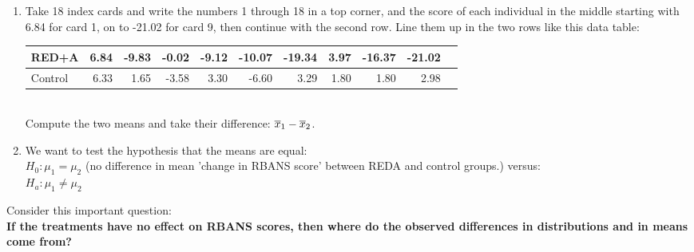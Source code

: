 \begin{enumerate}
\begin{minipage}{.6\linewidth}
\begin{key}
  {\it            RED+A seems most symmetric (boxplot), Cotrol
         has some outliers.
}
\end{key}
\end{minipage}


The researchers used a computer randomization to assign the 
subjects into the groups. We'll shuffle cards instead. 

\item  Take 18 index cards and write the numbers 1 through 18 in a top
  corner, and the score of each individual in the middle starting with
  6.84 for card 1, on to -21.02 for card 9, then continue with the
  second row. Line them up in the two rows  like this data table: 

  \begin{tabular}{l|rrrrrrrrrr} \hline
RED+A & 6.84&-9.83&-0.02&-9.12&-10.07&-19.34&3.97&-16.37&-21.02&\\ \hline
Control&6.33&1.65&-3.58&3.30&-6.60&3.29&1.80&1.80&2.98&\\ \hline
\end{tabular}\\
Compute the two means and take their difference: $\overline{x}_1 - \overline{x}_2$.
\vspace{1in}


\item We want to test the hypothesis that the means are equal:\\
  $H_0: \mu_1 = \mu_2$  (no difference in mean 'change in RBANS score'
  between REDA and control groups.)  versus:\\
  $H_a:  \mu_1 \neq \mu_2$\\
\end{enumerate}
Consider this important question:\\

{\bf \sf
If the treatments have no effect on RBANS scores, then where do the
observed differences in distributions and in means come from?
}\vspace*{.2cm}


